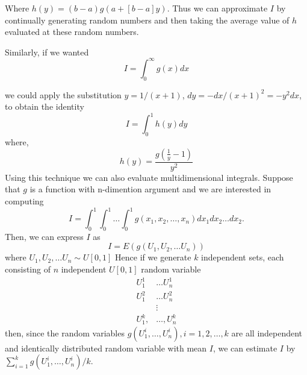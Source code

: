 Where $h(y)= (b-a)g(a+[b-a]y)$. Thus we can approximate $I$ by continually generating random
numbers and then taking the average value of $h$ evaluated at these random numbers.

Similarly, if we wanted
\[
	I = \int_{0}^{\infty} g(x) dx
\]

we could apply the substitution $y=1/(x+1)$, $dy=-dx/(x+1)^{2} = -y ^{2} dx$, to obtain the identity
\[
	I=\int_{0}^{1} h(y)dy
\]
where, \[
	h(y) = \frac{g(\frac{1}{y} -1)}{y ^{2}}
\]
Using this technique we can also evaluate multidimensional integrals. Suppose that $g$ is a function with n-dimention argument
and we are interested in computing
\[
	I = \int_{0}^{1} \int_{0}^{1} \ldots \int_{0}^{1} g(x_1, x_2 , \ldots , x_n) dx_1 dx_2 \ldots dx_2.
\]
Then, we can express $I$ as
\[
	I = E(g(U_1, U_2, \ldots U_n))
\]
where $U_1, U_2, \ldots U_n \sim U[0,1]$  Hence  if we generate $k$ independent sets, each consisting of $n$ independent $U[0,1]$
random variable
\begin{align*}
	U_1^{1}   & \ldots U_n^{1}  \\
	U_1^{2}   & \ldots U_n^{2}  \\
	          & \vdots          \\
	U_1^{k} , & \ldots, U_n^{k}
\end{align*}
then, since the random variables $g(U_1^{i},\ldots, U_n^{i}), i = 1,2,\ldots,k  $ are all independent and identically distributed
random variable with mean $I$, we can estimate $I$ by $\sum_{i = 1}^{k}g(U_1^{i} , \ldots, U_n^{i} )/k $.


